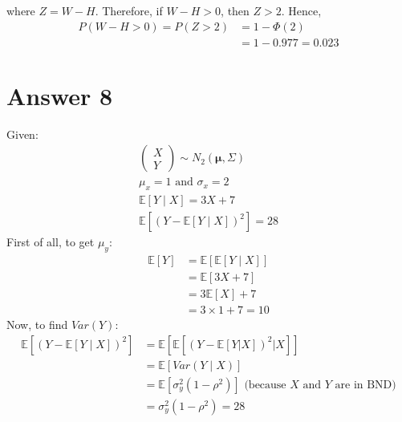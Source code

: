 \documentclass[a4paper]{article}
\begin{document}
 where $Z = W-H$.
 \newline\newline
 Therefore, if $W-H > 0$, then  $Z > 2$.
\newline\newline
Hence,
\begin{equation*}
	\begin{split}
		P\left( W- H > 0 \right) = P\left( Z >  2 \right) &= 1-\Phi\left( 2 \right)\\
		&= 1 - 0.977= 0.023
	\end{split}
\end{equation*}
\newpage

\section{Answer 8}
Given:
\begin{equation*}
	\begin{split}
		\begin{pmatrix} X\\Y \end{pmatrix} \sim N_2\left( \mathbf{\mu}, \Sigma \right)\\
		\mu_x = 1 \text{ and } \sigma_x = 2\\
		\mathbb{E}\left[ Y \mid X \right] = 3X+7\\
		\mathbb{E}\left[ \left( Y - \mathbb{E}\left[ Y \mid X \right]  \right) ^2 \right] = 28
		\end{split}
\end{equation*}
First of all, to get $\mu_y$:
 \begin{equation*}
\begin{split}
		\mathbb{E}\left[ Y \right] &=  \mathbb{E}\left[ \mathbb{E}\left[ Y  \mid  X \right]  \right]\\
	&= \mathbb{E}\left[ 3X+7 \right]\\
	&= 3\mathbb{E}\left[ X \right] + 7\\
	&= 3\times 1 +7 = 10
\end{split}
\end{equation*}
Now, to find $Var\left( Y \right) $:
\begin{equation*}
	\begin{split}
		\mathbb{E}\left[ \left( Y - \mathbb{E}\left[ Y \mid X \right]  \right) ^2 \right] &= \mathbb{E}\left[ \mathbb{E} \left[\left( Y - \mathbb{E}\left[ Y|X \right]  \right) ^2 | X\right] \right] \\
		&= \mathbb{E}\left[ Var\left( Y \mid X \right)  \right]  \\
		&= \mathbb{E}\left[ \sigma_y^2\left( 1- \rho^2 \right)  \right]\text{  (because $X\text{ and }Y$ are in BND)}\\
		&= \sigma_y^2\left( 1-\rho^2 \right) = 28 
	\end{split}
\end{equation*}
\end{document}
